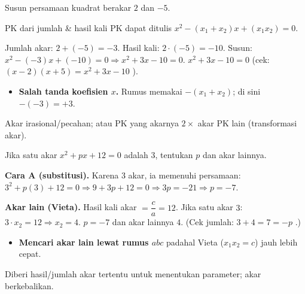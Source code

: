 \begin{soalbox}{}
Susun persamaan kuadrat berakar $2$ dan $-5$.
\end{soalbox}

\begin{ingat}{PK dari jumlah \& hasil kali}
PK dapat ditulis $x^2-(x_1+x_2)x+(x_1x_2)=0$.
\end{ingat}

\jawab
{} Jumlah akar: $2+(-5)=-3$. Hasil kali: $2\cdot(-5)=-10$.
 Susun: $x^2-(-3)x+(-10)=0\Rightarrow x^2+3x-10=0$.
\jadi $x^2+3x-10=0$ (cek: $(x-2)(x+5)=x^2+3x-10$ \checkmark).

\begin{jebakan}
\begin{itemize}[leftmargin=*,topsep=2pt]
  \item \textbf{Salah tanda koefisien $x$.} Rumus memakai $-(x_1+x_2)$; di sini
  $-(-3)=+3$.
\end{itemize}
\end{jebakan}

\begin{variasi}
Akar irasional/pecahan; atau PK yang akarnya $2\times$ akar PK lain (transformasi
akar).
\end{variasi}

\begin{soalbox}{}
Jika satu akar $x^2+px+12=0$ adalah $3$, tentukan $p$ dan akar lainnya.
\end{soalbox}

\jawab
\textbf{Cara A (substitusi).} Karena $3$ akar, ia memenuhi persamaan:
$3^2+p(3)+12=0\Rightarrow 9+3p+12=0\Rightarrow 3p=-21\Rightarrow p=-7$.

\textbf{Akar lain (Vieta).} Hasil kali akar $=\dfrac{c}{a}=12$. Jika satu akar
$3$: $3\cdot x_2=12\Rightarrow x_2=4$.
\jadi $p=-7$ dan akar lainnya $4$. (Cek jumlah: $3+4=7=-p$ \checkmark.)

\begin{jebakan}
\begin{itemize}[leftmargin=*,topsep=2pt]
  \item \textbf{Mencari akar lain lewat rumus $abc$} padahal Vieta ($x_1x_2=c$)
  jauh lebih cepat.
\end{itemize}
\end{jebakan}

\begin{variasi}
Diberi hasil/jumlah akar tertentu untuk menentukan parameter; akar berkebalikan.
\end{variasi}

